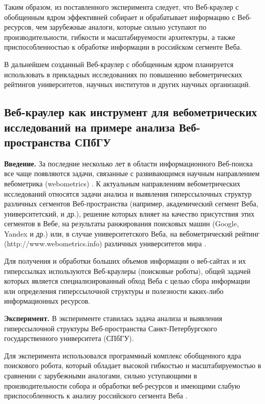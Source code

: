 Таким образом, из поставленного эксперимента следует, что Веб-краулер с обобщенным ядром эффективней собирает и обрабатывает информацию с Веб-ресурсов, чем зарубежные аналоги, которые сильно уступают по производительности, гибкости и масштабируемости архитектуры, а также приспособленностью к обработке информации в российском сегменте Веба.

В дальнейшем созданный Веб-краулер с обобщенным ядром планируется использовать в прикладных исследованиях по повышению вебометрических рейтингов университетов, научных институтов и других научных организаций.

\subsection{Веб-краулер как инструмент для вебометрических исследований на примере анализа Веб-пространства СПбГУ}\label{subsec:ch1/sec3/sub2}

\textbf{Введение.} За последние несколько лет в области информационного Веб-поиска все чаще появляются задачи, связанные с развивающимся научным направлением вебометрика (webometrics) \cite{HolmbergThelwall,Pechnikov,PechnikovChirkovChuiko,BlekanovSergeevPechnikov}. К актуальным направлениям вебометрических исследований относятся задачи анализа и выявления гиперссылочных структур различных сегментов Веб-пространства (например, академический сегмент Веба, университетский, и др.), решение которых влияет на качество присутствия этих сегментов в Вебе, на результаты ранжирования поисковых машин (Google, Yandex и др.) или, в случае университетского Веба, на вебометрический рейтинг (http://www.webometrics.info) различных университетов мира \cite{BlekanovSergeevPechnikov}.

 Для получения и обработки больших объемов информации о веб-сайтах и их гиперссылках используются Веб-краулеры (поисковые роботы), общей задачей которых является специализированный обход Веба с целью сбора информации или определения гиперссылочной структуры и полезности каких-либо информационных ресурсов.
 
\textbf{ Эксперимент.} В эксперименте ставилась задача анализа и выявления гиперссылочной структуры Веб-пространства Санкт-Петербургского государственного университета (СПбГУ). 
 
 Для эксперимента использовался программный комплекс обобщенного ядра поискового робота, который обладает высокой гибкостью и масштабируемостью в сравнении с зарубежными аналогами, сильно уступающими в производительности собора и обработки веб-ресурсов и имеющими слабую приспособленность к анализу российского сегмента Веба \cite{BlekanovSergeevMartynenko}. 
 
